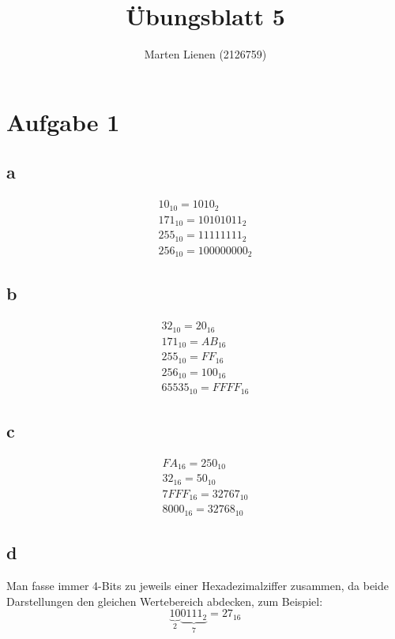 \documentclass[a4paper,10pt]{article}
\title{Übungsblatt 5}
\author{Marten Lienen (2126759)}
\begin{document}
\maketitle

\section*{Aufgabe 1}

\subsection*{a}

\begin{align*}
 10_{10} = 1010_2\\
 171_{10} = 10101011_2\\
 255_{10} = 11111111_2\\
 256_{10} = 100000000_2
\end{align*}

\subsection*{b}

\begin{align*}
 32_{10} = 20_{16}\\
 171_{10} = AB_{16}\\
 255_{10} = FF_{16}\\
 256_{10} = 100_{16}\\
 65535_{10} = FFFF_{16}
\end{align*}

\subsection*{c}

\begin{align*}
 FA_{16} = 250_{10}\\
 32_{16} = 50_{10}\\
 7FFF_{16} = 32767_{10}\\
 8000_{16} = 32768_{10}
\end{align*}

\subsection*{d}

Man fasse immer 4-Bits zu jeweils einer Hexadezimalziffer zusammen, da beide Darstellungen den gleichen Wertebereich abdecken, zum Beispiel:
\begin{equation*}
 {\underbrace{10}_2\underbrace{0111_{2}}_7} = 27_{16}
\end{equation*}
\end{document}
